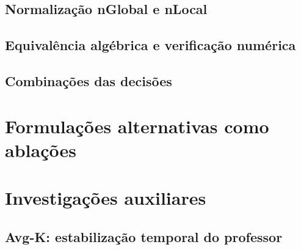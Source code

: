 \subsection{Normalização nGlobal e nLocal}

\subsection{Equivalência algébrica e verificação numérica}

\subsection{Combinações das decisões}

\section{Formulações alternativas como ablações}

\section{Investigações auxiliares}

\subsection{Avg-K: estabilização temporal do professor}

